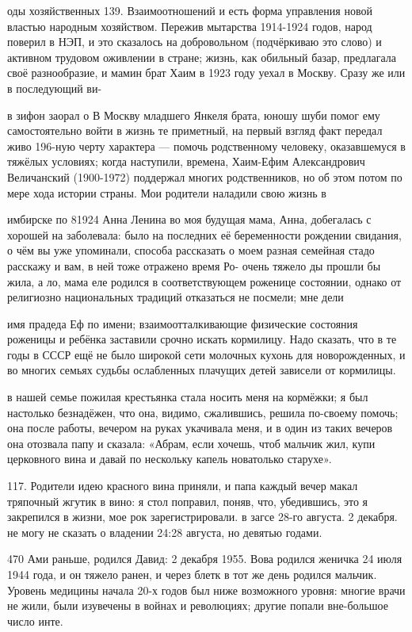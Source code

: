 оды хозяйственных 139. Взаимоотношений и есть форма управления новой властью народным хозяйством. Пережив мытарства 1914-1924 годов, народ поверил в НЭП, и это сказалось на добровольном (подчёркиваю это слово) и активном трудовом оживлении в стране; жизнь, как обильный базар, предлагала своё разнообразие, и мамин брат Хаим в 1923 году уехал в Москву. Сразу же или в последующий ви-

в зифон заорал о В Москву младшего Янкеля брата, юношу шуби помог ему самостоятельно войти в жизнь те приметный, на первый взгляд факт передал живо 196-ную черту характера — помочь родственному человеку, оказавшемуся в тяжёлых условиях; когда наступили, времена, Хаим-Ефим Александрович Величанский (1900-1972) поддержал многих родственников, но об этом потом по мере хода истории страны. Мои родители наладили свою жизнь в

имбирске по 81924 Анна Ленина во моя будущая мама, Анна, добегалась с хорошей на заболевала: было на последних её беременности рождении свидания, о чём вы уже упоминали, способа рассказать о моем разная семейная стадо расскажу и вам, в ней тоже отражено время Ро- очень тяжело ды прошли бы жила, а ло, мама еле родился в соответствующем роженице состоянии, однако от религиозно национальных традиций отказаться не посмели; мне дели

имя прадеда
Еф по имени; взаимоотталкивающие физические состояния роженицы и ребёнка заставили срочно искать кормилицу. Надо сказать, что в те годы в СССР ещё не было широкой сети молочных кухонь для новорожденных, и во многих семьях судьбы ослабленных плачущих детей зависели от кормилицы.

в нашей семье пожилая крестьянка стала носить меня на кормёжки; я был настолько безнадёжен, что она, видимо, сжалившись, решила по-своему помочь; она после работы, вечером на руках укачивала меня, и в один из таких вечеров она отозвала папу и сказала: «Абрам, если хочешь, чтоб мальчик жил, купи церковного вина и давай по нескольку капель новатолько старухе».

117. Родители идею красного вина приняли, и папа каждый вечер макал тряпочный жгутик в вино: я стол поправил, поняв, что, убедившись, это я закрепился в жизни, мое рок зарегистрировали. в загсе 28-го августа. 2 декабря. не могу не сказать о владении 24:28 августа, но девятью годами.

470
Ами раньше, родился Давид: 2 декабря 1955. Вова родился женичка 24 июля 1944 года, и он тяжело ранен, и через блетк в тот же день родился мальчик.
Уровень медицины начала 20-х годов был ниже возможного уровня: многие врачи не жили, были изувечены в войнах и революциях; другие попали вне-большое число инте.

